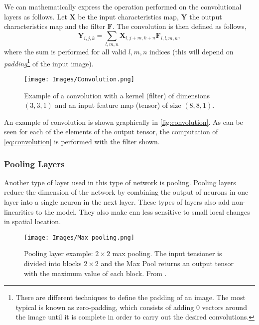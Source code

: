 We can mathematically express the operation performed on the convolutional
layers as follows. Let \(\mathbf{X}\) be the input characteristics map,
\(\mathbf{Y}\) the output characteristics map and the filter
\(\mathbf{F}\). The convolution is then defined as follows,
\begin{equation} \label{eq:convolution}
  \mathbf{Y}_{i, j, k} =
  \sum_{l, m, n} \mathbf{X}_{l, j + m, k + n}\mathbf{F}_{i, l, m, n},
\end{equation}
where the sum is performed for all valid \(l, m, n\) indices (this will depend
on \emph{padding}\footnote{There are different techniques to define the
  padding of an image. The most typical is known as zero-padding, which
  consists of adding 0 vectors around the image until it is complete in order
  to carry out the desired convolutions.} of the input image).

\begin{figure}[ht]
  \centering
  \texttt{[image: Images/Convolution.png]}
  \caption[Example of a convolution]{Example of a convolution with a kernel
    (filter) of dimensions \((3, 3, 1)\) and an input feature map (tensor) of
    size \((8, 8, 1)\).}
  \label{fig:convolution}
\end{figure}

An example of convolution is shown graphically in \vref{fig:convolution}. As
can be seen for each of the elements of the output tensor, the computation of
\vref{eq:convolution} is performed with the filter shown.

\subsubsection{Pooling Layers}
Another type of layer used in this type of network is pooling. Pooling layers
reduce the dimension of the network by combining the output of neurons in one
layer into a single neuron in the next layer. These types of layers also add
non-linearities to the model. They also make \gls{cnn} less sensitive to small
local changes in spatial location.

\begin{figure}[ht]
  \centering
  \texttt{[image: Images/Max pooling.png]}
  \caption[Pooling layer example: max pooling]{Pooling layer example:
    \(2 \times 2\) max pooling. The input tensioner is divided into blocks
    \(2 \times 2\) and the Max Pool returns an output tensor with the maximum
    value of each block. From
    .}\label{fig:max-pool}
\end{figure}

